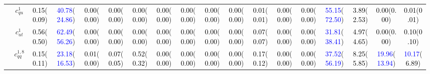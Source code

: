 \documentclass{article}
\begin{document}
\begin{landscape}
\begin{table}[H]
\begin{tabular}{|c|c|c|c|c|c|c|c|c|c|c|c|c|c|c|c|c|c|}
 & $c_{qu}^{1}$ & \textcolor{black}{0.15}(\textcolor{black}{0.09}) & \textcolor{blue}{40.78}(\textcolor{blue}{24.86}) & \textcolor{black}{0.00}(\textcolor{black}{0.00}) & \textcolor{black}{0.00}(\textcolor{black}{0.00}) & \textcolor{black}{0.00}(\textcolor{black}{0.00}) & \textcolor{black}{0.00}(\textcolor{black}{0.00}) & \textcolor{black}{0.00}(\textcolor{black}{0.00}) & \textcolor{black}{0.00}(\textcolor{black}{0.00}) & \textcolor{black}{0.00}(\textcolor{black}{0.00}) & \textcolor{black}{0.01}(\textcolor{black}{0.01}) & \textcolor{black}{0.00}(\textcolor{black}{0.00}) & \textcolor{black}{0.00}(\textcolor{black}{0.00}) & \textcolor{blue}{55.15}(\textcolor{blue}{72.50}) & \textcolor{black}{3.89}(\textcolor{black}{2.53}) & \textcolor{black}{0.00}(\textcolor{black}{0.00}) & \textcolor{black}{0.01}(\textcolor{black}{0.01})\\ \cline{2-18}
 & $c_{ut}^{1}$ & \textcolor{black}{0.56}(\textcolor{black}{0.50}) & \textcolor{blue}{62.49}(\textcolor{blue}{56.26}) & \textcolor{black}{0.00}(\textcolor{black}{0.00}) & \textcolor{black}{0.00}(\textcolor{black}{0.00}) & \textcolor{black}{0.00}(\textcolor{black}{0.00}) & \textcolor{black}{0.00}(\textcolor{black}{0.00}) & \textcolor{black}{0.00}(\textcolor{black}{0.00}) & \textcolor{black}{0.00}(\textcolor{black}{0.00}) & \textcolor{black}{0.00}(\textcolor{black}{0.00}) & \textcolor{black}{0.07}(\textcolor{black}{0.07}) & \textcolor{black}{0.00}(\textcolor{black}{0.00}) & \textcolor{black}{0.00}(\textcolor{black}{0.00}) & \textcolor{blue}{31.81}(\textcolor{blue}{38.41}) & \textcolor{black}{4.97}(\textcolor{black}{4.65}) & \textcolor{black}{0.00}(\textcolor{black}{0.00}) & \textcolor{black}{0.10}(\textcolor{black}{0.10})\\ \cline{2-18}
 & $c_{qq}^{1,8}$ & \textcolor{black}{0.15}(\textcolor{black}{0.11}) & \textcolor{blue}{23.18}(\textcolor{blue}{16.53}) & \textcolor{black}{0.01}(\textcolor{black}{0.00}) & \textcolor{black}{0.07}(\textcolor{black}{0.05}) & \textcolor{black}{0.52}(\textcolor{black}{0.32}) & \textcolor{black}{0.00}(\textcolor{black}{0.00}) & \textcolor{black}{0.00}(\textcolor{black}{0.00}) & \textcolor{black}{0.00}(\textcolor{black}{0.00}) & \textcolor{black}{0.00}(\textcolor{black}{0.00}) & \textcolor{black}{0.17}(\textcolor{black}{0.12}) & \textcolor{black}{0.00}(\textcolor{black}{0.00}) & \textcolor{black}{0.00}(\textcolor{black}{0.00}) & \textcolor{blue}{37.52}(\textcolor{blue}{56.19}) & \textcolor{black}{8.25}(\textcolor{black}{5.85}) & \textcolor{blue}{19.96}(\textcolor{blue}{13.94}) & \textcolor{blue}{10.17}(\textcolor{black}{6.89})\\ \cline{2-18}

\end{tabular}
\end{table}
\end{landscape}
\end{document}
